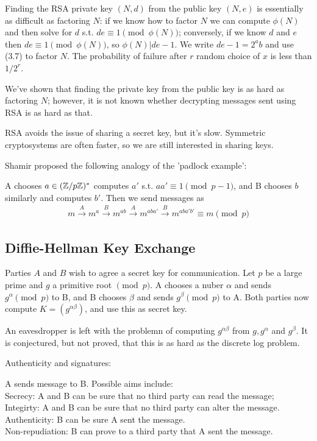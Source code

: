 \documentclass[a4paper]{article}
\begin{document}
\begin{coro}
Finding the RSA private key $(N,d)$ from the public key $(N,e)$ is essentially as difficult as factoring $N$: if we know how to factor $N$ we can compute $\phi(N)$ and then solve for $d$ s.t. $de \equiv 1 \pmod {\phi(N)}$; conversely, if we know $d$ and $e$ then $de\equiv 1 \pmod {\phi(N)}$, so $\phi(N) | de-1$. We write $de-1 = 2^a b$ and use (3.7) to factor $N$. The probability of failure after $r$ random choice of $x$ is less than $1/2^r$.
\end{coro}

We've shown that finding the private key from the public key is as hard as factoring $N$; however, it is not known whether decrypting messages sent using RSA is as hard as that.

RSA avoids the issue of sharing a secret key, but it's slow. Symmetric cryptosystems are often faster, so we are still interested in sharing keys.

Shamir proposed the following analogy of the 'padlock example':

A chooses $a \in (\mathbb{Z}/p\mathbb{Z})^*$ computes $a'$ s.t. $aa' \equiv 1 \pmod {p-1}$, and B chooses $b$ similarly and computes $b'$. Then we send messages as
\begin{equation*}
\begin{aligned}
m \xrightarrow{A} m^a \xrightarrow{B} m^{ab} \xrightarrow{A} m^{aba'} \xrightarrow{B} m^{aba'b'} \equiv m \pmod p
\end{aligned}
\end{equation*}

\subsection{Diffie-Hellman Key Exchange}

Parties $A$ and $B$ wish to agree a secret key for communication. Let $p$ be a large prime and $g$ a primitive root $\pmod p$. A chooses a nuber $\alpha$ and sends $g^\alpha \pmod p$ to B, and B chooses $\beta$ and sends $g^\beta \pmod p$ to A. Both parties now compute $K = (g^{\alpha\beta})$, and use this as secret key.

An eavesdropper is left with the problemn of computing $g^{\alpha \beta}$ from $g,g^\alpha$ and $g^\beta$. It is conjectured, but not proved, that this is as hard as the discrete log problem.

Authenticity and signatures:

A sends message to B. Possible aims include:\\
Secrecy: A and B can be sure that no third party can read the message;\\
Integirty: A and B can be sure that no third party can alter the message.\\
Authenticity: B can be sure A sent the message.\\
Non-repudiation: B can prove to a third party that A sent the message.
\end{document}
